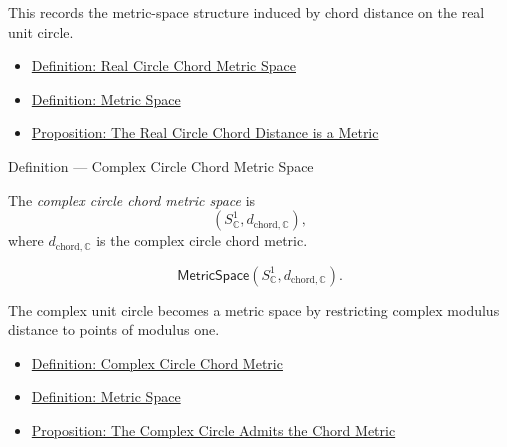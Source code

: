 \begin{remark*}[Interpretation]
This records the metric-space structure induced by chord distance on the real unit circle.
\end{remark*}

\begin{dependencies}
\begin{itemize}
  \item \hyperref[def:real-circle-chord-metric-space]{Definition: Real Circle Chord Metric Space}
  \item \hyperref[def:metric-space]{Definition: Metric Space}
  \item \hyperref[prop:real-circle-chord-metric]{Proposition: The Real Circle Chord Distance is a Metric}
\end{itemize}
\end{dependencies}

\begin{definitionbox}{Definition --- Complex Circle Chord Metric Space}
\begin{definition}
\label{def:complex-circle-chord-metric-space}
The \emph{complex circle chord metric space} is
\[
  (S^1_{\mathbb{C}},d_{\mathrm{chord},\mathbb{C}}),
\]
where \(d_{\mathrm{chord},\mathbb{C}}\) is the complex circle chord metric.
\end{definition}
\end{definitionbox}

\begin{remark*}
\[
\mathsf{MetricSpace}(S^1_{\mathbb{C}},d_{\mathrm{chord},\mathbb{C}}).
\]
\end{remark*}

\begin{remark*}[Interpretation]
The complex unit circle becomes a metric space by restricting complex modulus
distance to points of modulus one.
\end{remark*}

\begin{dependencies}
\begin{itemize}
  \item \hyperref[def:complex-circle-chord-metric]{Definition: Complex Circle Chord Metric}
  \item \hyperref[def:metric-space]{Definition: Metric Space}
  \item \hyperref[prop:complex-circle-chord-metric]{Proposition: The Complex Circle Admits the Chord Metric}
\end{itemize}
\end{dependencies}


